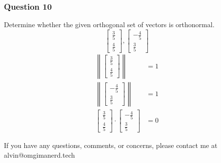 \documentclass{math}
\begin{document}
\subsubsection*{Question 10}
Determine whether the given orthogonal set of vectors is orthonormal.
\[ \begin{bmatrix}\frac{3}{5} \\ \frac{4}{5}\end{bmatrix},
  \begin{bmatrix}-\frac{4}{5} \\ \frac{3}{5}\end{bmatrix} \]
\begin{align*}
  \left\|\begin{bmatrix}\frac{3}{5} \\ \frac{4}{5}\end{bmatrix}\right\| &= 1 \\
  \left\|\begin{bmatrix}-\frac{4}{5} \\ \frac{3}{5}\end{bmatrix}\right\| &= 1 \\
  \begin{bmatrix}\frac{3}{5} \\ \frac{4}{5}\end{bmatrix}\cdot
    \begin{bmatrix}-\frac{4}{5} \\ \frac{3}{5}\end{bmatrix} &= 0
\end{align*}

\begin{center}
  If you have any questions, comments, or concerns, please contact me at
  alvin@omgimanerd.tech
\end{center}
\end{document}
